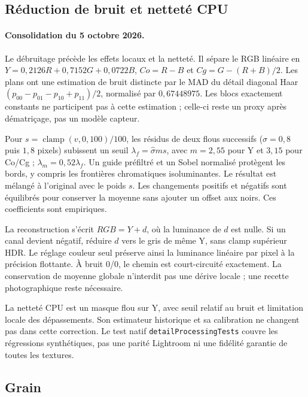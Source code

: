 \subsection{Réduction de bruit et netteté CPU}

\paragraph{Consolidation du 5 octobre 2026.}

Le débruitage précède les effets locaux et la netteté. Il sépare le RGB
linéaire en $Y=0{,}2126R+0{,}7152G+0{,}0722B$, $Co=R-B$ et
$Cg=G-(R+B)/2$. Les plans ont une estimation de bruit distincte par le MAD
du détail diagonal Haar $(p_{00}-p_{01}-p_{10}+p_{11})/2$, normalisé par
$0{,}67448975$. Les blocs exactement constants ne participent pas à cette
estimation ; celle-ci reste un proxy après dématriçage, pas un modèle capteur.

Pour $s=\operatorname{clamp}(v,0,100)/100$, les résidus de deux flous
successifs ($\sigma=0{,}8$ puis $1{,}8$ pixels) subissent un seuil
$\lambda_f=\widehat\sigma ms$, avec $m=2{,}55$ pour Y et $3{,}15$ pour
Co/Cg ; $\lambda_m=0{,}52\lambda_f$. Un guide préfiltré et un Sobel
normalisé protègent les bords, y compris les frontières chromatiques
isoluminantes. Le résultat est mélangé à l'original avec le poids $s$.
Les changements positifs et négatifs sont équilibrés pour conserver la
moyenne sans ajouter un offset aux noirs. Ces coefficients sont empiriques.

La reconstruction s'écrit $RGB=Y+d$, où la luminance de $d$ est nulle.
Si un canal devient négatif, réduire $d$ vers le gris de même Y, sans
clamp supérieur HDR. Le réglage couleur seul préserve ainsi la luminance
linéaire par pixel à la précision flottante. À bruit 0/0, le chemin est
court-circuité exactement. La conservation de moyenne globale n'interdit
pas une dérive locale ; une recette photographique reste nécessaire.

La netteté CPU est un masque flou sur Y, avec seuil relatif au bruit et
limitation locale des dépassements. Son estimateur historique et sa
calibration ne changent pas dans cette correction. Le test natif
\texttt{detailProcessingTests} couvre les régressions synthétiques, pas une
parité Lightroom ni une fidélité garantie de toutes les textures.

\subsection{Grain}

